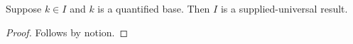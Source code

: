 

\begin{theorem}\label{supplied_negative_finite_samples}
    Suppose $k\in I$ and $k$ is a quantified base.
    Then $I$ is a supplied-universal result.
\end{theorem}
\begin{proof}
    Follows by notion.
\end{proof}
